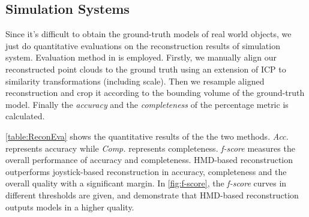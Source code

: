 \documentclass[journal]{IEEEtran}
\begin{document}
\subsection{Simulation Systems}

Since it's difficult to obtain the ground-truth models of real world objects, we 
just do quantitative evaluations on the reconstruction results of simulation system. 
Evaluation method in \cite{Knapitsch2017} is employed. Firstly, we manually align our 
reconstructed point clouds to the ground truth using an extension of ICP to similarity 
transformations (including scale). Then we resample aligned reconstruction and crop it 
according to the bounding volume of the ground-truth model. Finally the \emph{accuracy} and the 
\emph{completeness} of the percentage metric is calculated.

\autoref{table:ReconEva} shows the quantitative results of the the two methods. \emph{Acc.} 
represents accuracy while \emph{Comp.} represents completeness. \emph{f-score} measures the 
overall performance of accuracy and completeness. HMD-based reconstruction outperforms 
joystick-based reconstruction in accuracy, completeness and the overall quality with a 
significant margin. In \autoref{fig:f-score}, the \emph{f-score} curves in different thresholds are 
given, and demonstrate that HMD-based reconstruction outputs models in a higher quality. 



\end{document}
